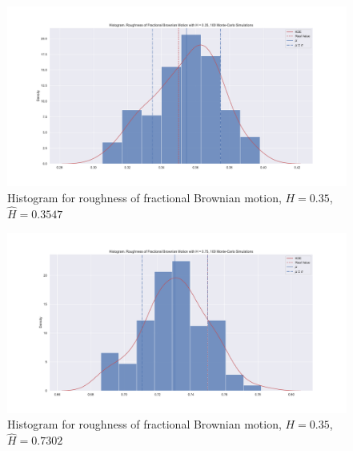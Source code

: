             \begin{frame}{}
                \begin{figure}[htbp]
                    \centering
                    \includegraphics[width=0.9\linewidth]{fig/Histogram. Roughness of Fractional Brownian Motion with H = 0.35, 100 Monte-Carlo Simulations.pdf}
                    \caption{Histogram for roughness of fractional Brownian motion, $H = 0.35$, $\hat{H} = 0.3547$}
                \end{figure}
            \end{frame}
            
            \begin{frame}{}
                \begin{figure}[htbp]
                    \centering
                    \includegraphics[width=0.9\linewidth]{fig/Histogram. Roughness of Fractional Brownian Motion with H = 0.75, 100 Monte-Carlo Simulations.pdf}
                    \caption{Histogram for roughness of fractional Brownian motion, $H = 0.35$, $\hat{H} = 0.7302$}
                \end{figure}
            \end{frame}
